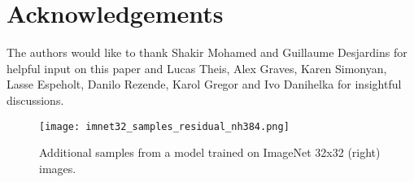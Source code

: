 \documentclass{article}
\begin{document}
 

\section*{Acknowledgements}

The authors would like to thank Shakir Mohamed and Guillaume Desjardins for helpful input on this paper and Lucas Theis, Alex Graves, Karen Simonyan, Lasse Espeholt, Danilo Rezende, Karol Gregor and Ivo Danihelka for insightful discussions.
 







\begin{figure*}[p]

\centering
\texttt{[image: imnet32\_samples\_residual\_nh384.png]}
\caption{Additional samples from a model trained on ImageNet 32x32 (right) images.}
\label{fig:appendix_imagenet_32}
\end{figure*}


 
\end{document}
